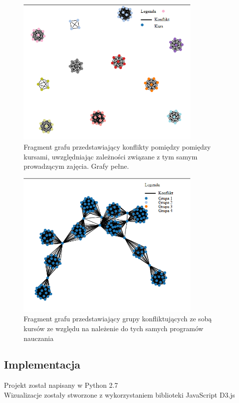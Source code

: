 \begin{figure}[H]
  \centering
  \caption{Fragment grafu przedstawiający konflikty pomiędzy pomiędzy kursami, uwzględniając zależności związane z tym samym prowadzącym zajęcia. Grafy pełne.}
    \includegraphics[width=0.8\textwidth]{szkola1.PNG}
\end{figure}
\begin{figure}[H]
  \centering
   \caption{Fragment grafu przedstawiający grupy konfliktujących ze sobą kursów ze względu na należenie do tych samych programów nauczania}
   \includegraphics[width=0.8\textwidth]{fragmentszkola.PNG}
 
\end{figure}


\subsection{Implementacja}
Projekt został napisany w Python 2.7 \\
Wizualizacje zostały stworzone z wykorzystaniem biblioteki JavaScript D3.js 
\cite{wiz}

